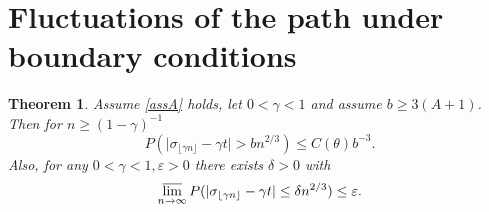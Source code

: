 \documentclass[11pt]{amsart}
\newtheorem{theorem}{\sc Theorem}[section]
\numberwithin{equation}{section}
\theoremstyle{remark}
\providecommand{\abs}[1]{\vert#1\vert}
\begin{document}
\section{Fluctuations of the path under boundary conditions}

\begin{theorem}
Assume \eqref{assA} holds,  let $0<\gamma<1$ and assume $b\ge 3(A+1)$.  Then for
$n\ge (1-\gamma)^{-1}$
\begin{equation} \label{path1}
P(\abs{\sigma_{\lfloor \gamma n \rfloor }-\gamma t}>b n^{2/3})\le C({\theta}) b^{-3}.
\end{equation} 
Also, for any $0<\gamma<1, \varepsilon>0$ there exists $\delta>0$ with 
\begin{equation}\label{path2} 
\varlimsup_{n\to \infty}P(|\sigma_{\lfloor \gamma n \rfloor }-\gamma t|\le \delta n^{2/3})\le \varepsilon.
\end{equation} 
\end{theorem}
\end{document}
